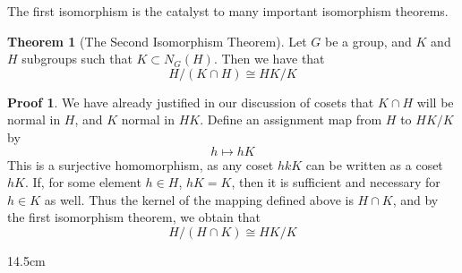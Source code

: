 \documentclass[12pt]{amsbook}
\theoremstyle{definition}
\newtheorem{theorem}{Theorem}[chapter]
\newtheorem*{prf}{Proof}
\begin{document}
The first isomorphism is the catalyst to many important isomorphism theorems.

\begin{theorem}[The Second Isomorphism Theorem]  
    Let $G$ be a group, and $K$ and $H$ subgroups such that $K \subset N_G(H)$. Then we have that
    \[ H/(K \cap H) \cong HK/K \]
\end{theorem}
\begin{prf}
We have already justified in our discussion of cosets that $K \cap H$ will be normal in $H$, and $K$ normal in $HK$. Define an assignment map from $H$ to $HK/K$ by
%
\[ h \mapsto hK \]
%
This is a surjective homomorphism, as any coset $hkK$ can be written as a coset $hK$. If, for some element $h \in H$, $hK = K$, then it is sufficient and necessary for $h \in K$ as well. Thus the kernel of the mapping defined above is $H \cap K$, and by the first isomorphism theorem, we obtain that
%
\[ H/(H \cap K) \cong HK/K \]
\end{prf}

\begin{wrapfigure}{1}{4.5cm}
\end{wrapfigure}
\end{document}
